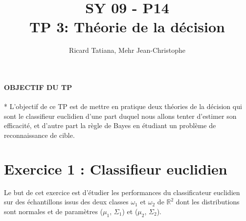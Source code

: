 \documentclass[a4paper, 8pt]{article}
\title{SY 09 - P14 \\TP 3: Théorie de la décision}
\author{Ricard Tatiana, Mehr Jean-Christophe}
\date{}
\begin{document}
\maketitle

\textbf{ OBJECTIF DU TP} \\
\\* L’objectif de ce TP est de mettre en pratique deux théories de la décision qui sont le classifieur euclidien d’une part duquel nous allons tenter d’estimer son efficacité, et d’autre part la règle de Bayes en étudiant un problème de reconnaissance de cible.\\

\section*{Exercice 1 : Classifieur euclidien}
Le but de cet exercice est d’étudier les performances du classificateur euclidien sur des échantillons issus des deux classes $\omega_{1}$ et $\omega_{2}$ de $\mathbb{R}^{2}$ dont les distributions sont normales et de paramètres ($\mu_{1}$, $\Sigma_{1}$) et ($\mu_{2}$, $\Sigma_{2}$).
\end{document}
